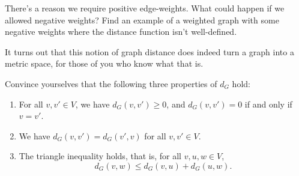 \documentclass[nobib]{tufte-handout}
\begin{document}
\begin{xca}
  There's a reason we require positive edge-weights. What could happen if we allowed negative weights? Find an example of a weighted graph with some negative weights where the distance function isn't well-defined.
\end{xca}

It turns out that this notion of graph distance does indeed turn a graph into a metric space, for those of you who know what that is.

\begin{xca}
  Convince yourselves that the following three properties of $d_G$ hold:
  \begin{enumerate}
    \item For all $v, v' \in V$, we have $d_G(v, v') \geq 0$, and $d_G(v,v') = 0$ if and only if $v = v'$.
    \item We have $d_G(v,v') = d_G(v',v)$ for all $v, v' \in V$.
    \item The triangle inequality holds, that is, for all $v, u, w \in V$,
    $$d_G(v, w) \leq d_G(v, u) + d_G(u, w).$$
  \end{enumerate}
\end{xca}

%
%
\end{document}
